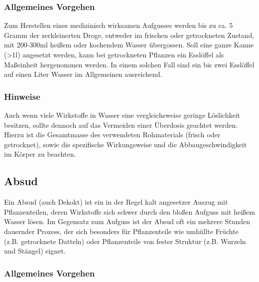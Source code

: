 \subsubsection{Allgemeines Vorgehen}
\label{   }

Zum Herstellen eines medizinisch wirksamen Aufgusses werden bis zu ca. 5 Gramm der zerkleinerten Droge, entweder im frischen oder getrockneten Zustand, mit 200-300ml heißem oder kochendem Wasser übergossen. Soll eine ganze Kanne (>1l) angesetzt werden, kann bei getrockneten Pflanzen ein Esslöffel als Maßeinheit hergenommen werden. In einem solchen Fall sind ein bis zwei Esslöffel auf einen Liter Wasser im Allgemeinen ausreichend.



\subsubsection{Hinweise}
\label{   }

Auch wenn viele Wirkstoffe in Wasser eine vergleichsweise geringe Löslichkeit besitzen, sollte dennoch auf das Vermeiden einer Überdosis geachtet werden. Hierzu ist die Gesamtmasse des verwendeten Rohmaterials (frisch oder getrocknet), sowie die spezifische Wirkungsweise und die Abbaugeschwindigkeit im Körper zu beachten.



\subsection{Absud}
\label{   }

Ein Absud (auch Dekokt) ist ein in der Regel kalt angesetzer Auszug mit Pflanzenteilen, deren Wirkstoffe sich schwer durch den bloßen Aufguss mit heißem Wasser lösen. Im Gegensatz zum Aufguss ist der Absud oft ein mehrere Stunden dauernder Prozess, der sich besonders für Pflanzenteile wie umhüllte Früchte (z.B. getrocknete Datteln) oder Pflanzenteile von fester Struktur (z.B. Wurzeln und Stängel) eignet.



\subsubsection{Allgemeines Vorgehen}
\label{   }

